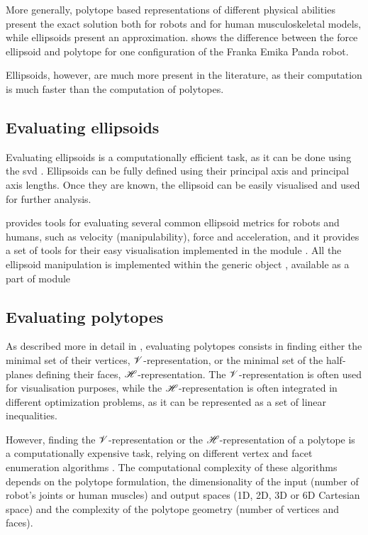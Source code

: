 More generally, polytope based representations of different physical abilities present the exact solution both for robots and for human musculoskeletal models, while ellipsoids present an approximation. 
 shows the difference between the force ellipsoid and polytope \cite{chiacchio_evaluation_1996} for one configuration of the Franka Emika Panda robot.

Ellipsoids, however, are much more present in the literature, as their computation is much faster than the computation of polytopes. 

\subsection{Evaluating ellipsoids}

Evaluating ellipsoids is a computationally efficient task, as it can be done using the \gls{svd} \cite{yoshikawa1985manipulability}. Ellipsoids can be fully defined using their principal axis and principal axis lengths. Once they are known, the ellipsoid can be easily visualised and used for further analysis.

 provides tools for evaluating several common ellipsoid metrics for robots and humans, such as velocity (manipulability), force and acceleration, and it provides a set of tools for their easy visualisation implemented in the module . All the ellipsoid manipulation is implemented within the generic object , available as a part of  module

\subsection{Evaluating polytopes}
\label{sec:pycapacity_impelmented_polytopes}
As described more in detail in , evaluating polytopes consists in finding either the minimal set of their vertices, $\mathscr{V}$-representation, or the minimal set of the half-planes defining their faces, $\mathscr{H}$-representation. The $\mathscr{V}$-representation is often used for visualisation purposes, while the $\mathscr{H}$-representation is often integrated in different optimization problems, as it can be represented as a set of linear inequalities.

However, finding the $\mathscr{V}$-representation or the $\mathscr{H}$-representation of a polytope is a computationally expensive task, relying on different vertex and facet enumeration algorithms \cite{fukuda2004frequently}. The computational complexity of these algorithms depends on the polytope formulation, the dimensionality of the input (number of robot's joints or human muscles) and output spaces (1D, 2D, 3D or 6D Cartesian space) and the complexity of the polytope geometry (number of vertices and faces). 


